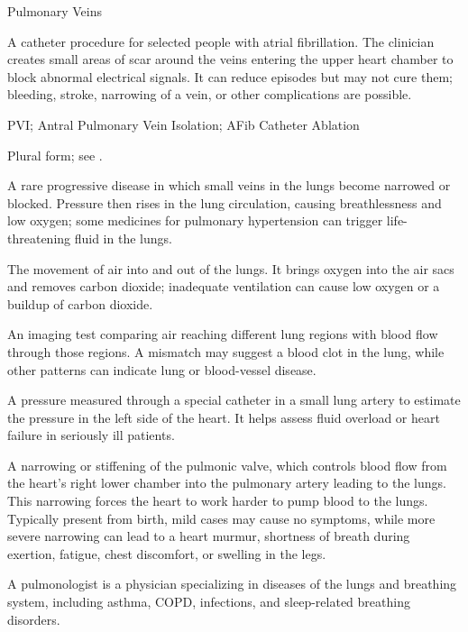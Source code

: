 \synonyms
Pulmonary Veins

 A catheter procedure for selected people with atrial fibrillation. The clinician creates small areas of scar around the veins entering the upper heart chamber to block abnormal electrical signals. It can reduce episodes but may not cure them; bleeding, stroke, narrowing of a vein, or other complications are possible.

\synonyms
PVI; Antral Pulmonary Vein Isolation; AFib Catheter Ablation

 Plural form; see .

 A rare progressive disease in which small veins in the lungs become narrowed or blocked. Pressure then rises in the lung circulation, causing breathlessness and low oxygen; some medicines for pulmonary hypertension can trigger life-threatening fluid in the lungs.

 The movement of air into and out of the lungs. It brings oxygen into the air sacs and removes carbon dioxide; inadequate ventilation can cause low oxygen or a buildup of carbon dioxide.

 An imaging test comparing air reaching different lung regions with blood flow through those regions. A mismatch may suggest a blood clot in the lung, while other patterns can indicate lung or blood-vessel disease.

 A pressure measured through a special catheter in a small lung artery to estimate the pressure in the left side of the heart. It helps assess fluid overload or heart failure in seriously ill patients.

 A narrowing or stiffening of the pulmonic valve, which controls blood flow from the heart's right lower chamber into the pulmonary artery leading to the lungs. This narrowing forces the heart to work harder to pump blood to the lungs. Typically present from birth, mild cases may cause no symptoms, while more severe narrowing can lead to a heart murmur, shortness of breath during exertion, fatigue, chest discomfort, or swelling in the legs.

 A pulmonologist is a physician specializing in diseases of the lungs and breathing system, including asthma, COPD, infections, and sleep-related breathing disorders.

